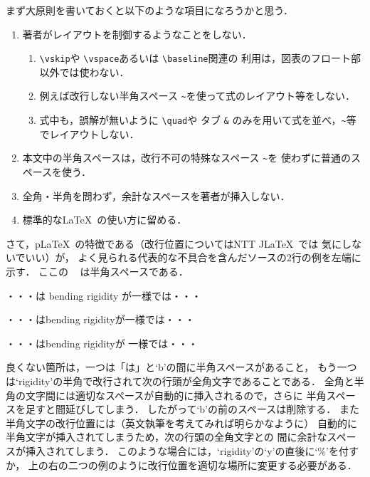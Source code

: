 \documentclass[onecolumn]{jsce}  %
\begin{document}
まず大原則を書いておくと以下のような項目になろうかと思う．
\begin{enumerate}
\item 著者がレイアウトを制御するようなことをしない．
\begin{enumerate}
\item \verb+\vskip+や \verb+\vspace+あるいは \verb+\baseline+関連の
利用は，図表のフロート部以外では使わない．
\item 例えば改行しない半角スペース \verb+~+を使って式のレイアウト等をしない．
\item 式中も，誤解が無いように \verb+\quad+や
タブ \verb+&+ のみを用いて式を並べ，\verb+~+等でレイアウトしない．
\end{enumerate}
\item 本文中の半角スペースは，改行不可の特殊なスペース \verb+~+を
使わずに普通のスペースを使う．
\item 全角・半角を問わず，余計なスペースを著者が挿入しない．
\item 標準的な\LaTeX\ の使い方に留める．
\end{enumerate}
さて，p\LaTeX\ の特徴である（改行位置についてはNTT J\LaTeX\ では
気にしないでいい）が，
よく見られる代表的な不具合を含んだソースの2行の例を左端に示す．
ここの \verb*+ + は半角スペースである．
\smallskip

\noindent\mbox{}\hfill
\begin{minipage}[t]{.28\textwidth}
\begin{verbatim*}
・・・は bending rigidity
が一様では・・・
\end{verbatim*}
\end{minipage}
\hfill
\begin{minipage}[t]{.28\textwidth}
\begin{verbatim*}
・・・はbending
   rigidityが一様では・・・
\end{verbatim*}
\end{minipage}
\hfill
\begin{minipage}[t]{.28\textwidth}
\begin{verbatim*}
・・・はbending rigidityが
一様では・・・
\end{verbatim*}
\end{minipage}
\hfill\mbox{}

\medskip
\noindent
良くない箇所は，一つは「は」と`b'の間に半角スペースがあること，
もう一つは`rigidity'の半角で改行されて次の行頭が全角文字であることである．
全角と半角の文字間には適切なスペースが自動的に挿入されるので，さらに
半角スペースを足すと間延びしてしまう．
したがって`b'の前のスペースは削除する．
また半角文字の改行位置には（英文執筆を考えてみれば明らかなように）
自動的に半角文字が挿入されてしまうため，次の行頭の全角文字との
間に余計なスペースが挿入されてしまう．
このような場合には，`rigidity'の`y'の直後に`\%'を付すか，
上の右の二つの例のように改行位置を適切な場所に変更する必要がある．
\end{document}
